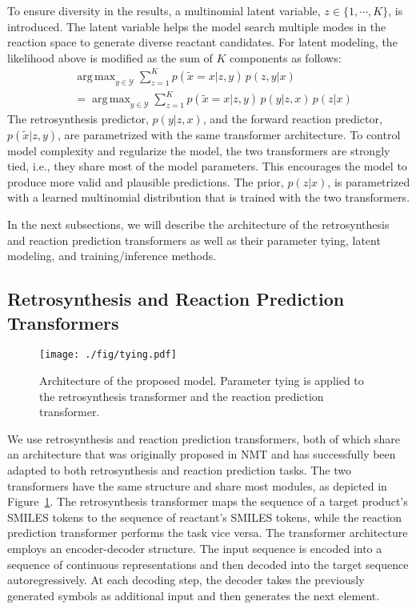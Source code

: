 \documentclass[journal=jacsat,manuscript=article]{achemso}
\DeclareMathOperator*{\argmax}{arg\,max}
\begin{document}
	To ensure diversity in the results, a multinomial latent variable, $z\in\{1,\cdots,K\}$, is introduced. The latent variable helps the model search multiple modes in the reaction space to generate diverse reactant candidates. For latent modeling, the likelihood above is modified as the sum of $K$ components as follows:
	\begin{equation}
	\begin{split}
	\label{eqn:latent_components}
	& \argmax_{y\in\mathcal{Y}} \sum_{z=1}^{K} p(\tilde{x}=x|z,y) \, p(z,y|x) \\
	& = \argmax_{y\in\mathcal{Y}} \sum_{z=1}^{K} p(\tilde{x}=x|z,y) \, p(y|z,x) \, p(z|x)
	\end{split}
	\end{equation}
	The retrosynthesis predictor, $p(y|z,x)$, and the forward reaction predictor, $p(\tilde{x}|z,y)$, are parametrized with the same transformer architecture. To control model complexity and regularize the model, the two transformers are strongly tied, i.e., they share most of the model parameters. This encourages the model to produce more valid and plausible predictions. The prior, $p(z|x)$, is parametrized with a learned multinomial distribution that is trained with the two transformers.

	In the next subsections, we will describe the architecture of the retrosynthesis and reaction prediction transformers as well as their parameter tying, latent modeling, and training/inference methods.
	
	
	\subsection{Retrosynthesis and Reaction Prediction Transformers}
	
	
	\begin{figure}
		\centering
		\texttt{[image: ./fig/tying.pdf]}
		\caption{Architecture of the proposed model. Parameter tying is applied to the retrosynthesis transformer and the reaction prediction transformer.}
		\label{fig:tying}
	\end{figure}
	
	
	We use retrosynthesis and reaction prediction transformers, both of which share an architecture that was originally proposed in NMT \cite{vaswani2017attention} and has successfully been adapted to both retrosynthesis \cite{zheng2019predicting, chen2019learning,karpov2019transformer,lin2020automatic} and reaction prediction \cite{schwaller2019molecular} tasks. The two transformers have the same structure and share most modules, as depicted in Figure~\ref{fig:tying}. The retrosynthesis transformer maps the sequence of a target product's SMILES tokens to the sequence of reactant's SMILES tokens, while the reaction prediction transformer performs the task vice versa. The transformer architecture employs an encoder-decoder structure. The input sequence is encoded into a sequence of continuous representations and then decoded into the target sequence autoregressively. At each decoding step, the decoder takes the previously generated symbols as additional input and then generates the next element.
	
\end{document}
